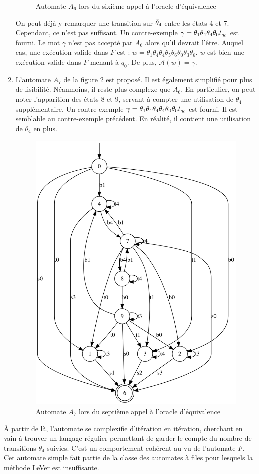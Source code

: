 \begin{enumerate}
\begin{figure}[H]
    \caption{Automate $A_6$ lors du sixième appel à l'oracle d'équivalence}\label{fig:andre6}
  \end{figure}
  On peut déjà y remarquer une transition sur $\bar{\theta}_4$ entre les états 4 et 7. Cependant, ce n'est pas suffisant. Un contre-exemple $\gamma=\bar{\theta}_1\bar{\theta}_4\bar{\theta}_4\bar{\theta}_0t_{q_0}$ est fourni. Le mot $\gamma$ n'est pas accepté par $A_6$ alors qu'il devrait l'être. Auquel cas, une exécution valide dans $F$ est : $w=\theta_1\theta_4\theta_4\theta_5\theta_6\theta_0\theta_3\theta_6$. $w$ est bien une exécution valide dans $F$ menant à $q_0$. De plus, $\mathcal{A}(w)=\gamma$.
  \item L'automate $A_7$ de la figure \ref{fig:andre7} est proposé. Il est également simplifié pour plus de lisibilité.
  Néanmoins, il reste plus complexe que $A_6$. En particulier, on peut noter l'apparition des états $8$ et $9$, servant à compter une utilisation de $\theta_4$ supplémentaire.
  Un contre-exemple $\gamma=\bar{\theta}_1\bar{\theta}_4\bar{\theta}_4\bar{\theta}_4\bar{\theta}_0\bar{\theta}_0t_{q_0}$ est fourni. Il est semblable au contre-exemple précédent. En réalité, il contient une utilisation de $\theta_4$ en plus.

  \begin{figure}[H]
    \centering
    \includegraphics[width=0.6\linewidth]{res/andre_7}
    \caption{Automate $A_7$ lors du septième appel à l'oracle d'équivalence}\label{fig:andre7}
  \end{figure}

\end{enumerate}

À partir de là, l'automate se complexifie d'itération en itération, cherchant en vain à trouver un langage régulier permettant de garder le compte du nombre de transitions $\theta_4$ suivies. C'est un comportement cohérent au vu de l'automate $F$. Cet automate simple fait partie de la classe des automates à files pour lesquels la méthode LeVer est insuffisante.
